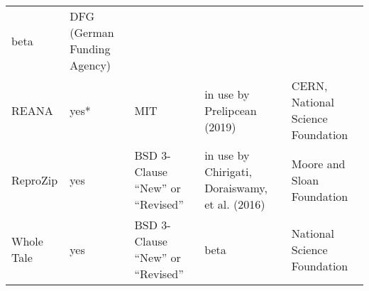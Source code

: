 \documentclass[onecolumn]{article}
\begin{document}
\begin{longtable}[]{@{}lllll@{}}
\begin{minipage}[t]{0.17\columnwidth}
beta\strut
\end{minipage} & \begin{minipage}[t]{0.29\columnwidth}\raggedright
DFG (German Funding Agency)\strut
\end{minipage}\tabularnewline
\begin{minipage}[t]{0.11\columnwidth}\raggedright
REANA\strut
\end{minipage} & \begin{minipage}[t]{0.11\columnwidth}\raggedright
yes*\strut
\end{minipage} & \begin{minipage}[t]{0.17\columnwidth}\raggedright
MIT\strut
\end{minipage} & \begin{minipage}[t]{0.17\columnwidth}\raggedright
in use by Prelipcean (2019)\strut
\end{minipage} & \begin{minipage}[t]{0.29\columnwidth}\raggedright
CERN, National Science Foundation\strut
\end{minipage}\tabularnewline
\begin{minipage}[t]{0.11\columnwidth}\raggedright
ReproZip\strut
\end{minipage} & \begin{minipage}[t]{0.11\columnwidth}\raggedright
yes\strut
\end{minipage} & \begin{minipage}[t]{0.17\columnwidth}\raggedright
BSD 3-Clause ``New'' or ``Revised''\strut
\end{minipage} & \begin{minipage}[t]{0.17\columnwidth}\raggedright
in use by Chirigati, Doraiswamy, et al. (2016)\strut
\end{minipage} & \begin{minipage}[t]{0.29\columnwidth}\raggedright
Moore and Sloan Foundation\strut
\end{minipage}\tabularnewline
\begin{minipage}[t]{0.11\columnwidth}\raggedright
Whole Tale\strut
\end{minipage} & \begin{minipage}[t]{0.11\columnwidth}\raggedright
yes\strut
\end{minipage} & \begin{minipage}[t]{0.17\columnwidth}\raggedright
BSD 3-Clause ``New'' or ``Revised''\strut
\end{minipage} & \begin{minipage}[t]{0.17\columnwidth}\raggedright
beta\strut
\end{minipage} & \begin{minipage}[t]{0.29\columnwidth}\raggedright
National Science Foundation\strut
\end{minipage}\tabularnewline
\bottomrule
\end{longtable}
\end{document}
